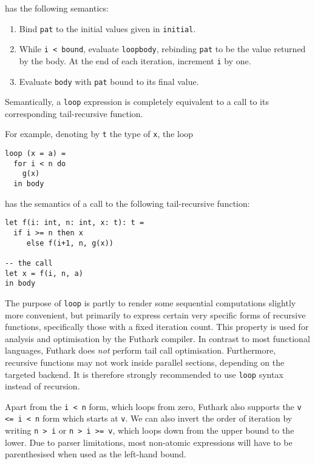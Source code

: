\documentclass[oneside,11pt]{book}
\begin{document}
\noindent
has the following semantics:

\begin{enumerate}
\item Bind \texttt{pat} to the initial values given in
  \texttt{initial}.
\item While \texttt{i < bound}, evaluate \texttt{loopbody}, rebinding
  \texttt{pat} to be the value returned by the body.  At the end of
  each iteration, increment \texttt{i} by one.
\item Evaluate \texttt{body} with \texttt{pat} bound to its final
  value.
\end{enumerate}

Semantically, a \texttt{loop} expression is completely equivalent to a
call to its corresponding tail-recursive function.

For example, denoting by \texttt{t} the type of \texttt{x}, the
loop

\begin{lstlisting}
loop (x = a) =
  for i < n do
    g(x)
  in body
\end{lstlisting}

\noindent
has the semantics of a call to the following tail-recursive function:

\begin{lstlisting}
let f(i: int, n: int, x: t): t =
  if i >= n then x
     else f(i+1, n, g(x))

-- the call
let x = f(i, n, a)
in body
\end{lstlisting}

The purpose of \texttt{loop} is partly to render some sequential
computations slightly more convenient, but primarily to express
certain very specific forms of recursive functions, specifically those
with a fixed iteration count.  This property is used for analysis and
optimisation by the Futhark compiler.  In contrast to most functional
languages, Futhark does \textit{not} perform tail call optimisation.
Furthermore, recursive functions may not work inside parallel
sections, depending on the targeted backend.  It is therefore strongly
recommended to use \texttt{loop} syntax instead of recursion.

Apart from the \texttt{i < n} form, which loops from zero, Futhark
also supports the \texttt{v <= i < n} form which starts at \texttt{v}.
We can also invert the order of iteration by writing \texttt{n > i} or
\texttt{n > i >= v}, which loops down from the upper bound to the
lower.  Due to parser limitations, most non-atomic expressions will
have to be parenthesised when used as the left-hand bound.
\end{document}
